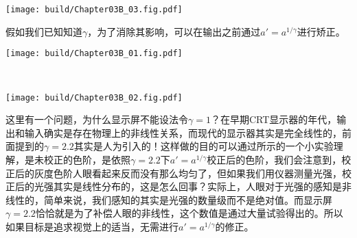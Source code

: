 \begin{Figure}[伽马值的测定方法]
    \texttt{[image: build/Chapter03B\_03.fig.pdf]}
\end{Figure}

假如我们已知知道$\gamma$，为了消除其影响，可以在输出之前通过$a'=a^{1/\gamma}$进行矫正。

\begin{Figure}[灰度色阶的对比]
    \begin{FigureSub}[校正前]
        \texttt{[image: build/Chapter03B\_01.fig.pdf]}
    \end{FigureSub}\\ \vspace{0.25cm}
    \begin{FigureSub}[校正后]
        \texttt{[image: build/Chapter03B\_02.fig.pdf]}
    \end{FigureSub}
\end{Figure}

这里有一个问题，为什么显示屏不能设法令$\gamma=1$？在早期CRT显示器的年代，输出和输入确实是存在物理上的非线性关系，而现代的显示器其实是完全线性的，前面提到的$\gamma=2.2$其实是人为引入的！这样做的目的可以通过所示的一个小实验理解，是未校正的色阶，是依照$\gamma=2.2$下$a'=a^{1/\gamma}$校正后的色阶，我们会注意到，校正后的灰度色阶人眼看起来反而没有那么均匀了，但如果我们用仪器测量光强，校正后的光强其实是线性分布的，这是怎么回事？实际上，人眼对于光强的感知是非线性的，简单来说，我们感知的其实是光强的数量级而不是绝对值。而显示屏$\gamma=2.2$恰恰就是为了补偿人眼的非线性，这个数值是通过大量试验得出的。所以如果目标是追求视觉上的适当，无需进行$a'=a^{1/\gamma}$的修正。